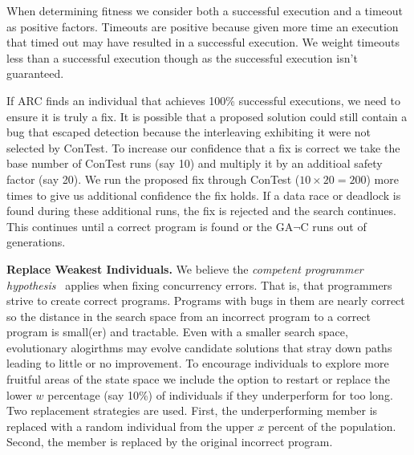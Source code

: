 \documentclass[runningheads,a4paper]{llncs}
\begin{document}
\noindent When determining fitness we consider both a successful execution and a timeout as positive factors. Timeouts are positive because given more time an execution that timed out may have resulted in a successful execution. We weight timeouts less than a successful execution though as the successful execution isn't guaranteed.

If ARC finds an individual that achieves 100\% successful executions, we need to ensure it is truly a fix. It is possible that a proposed solution could still contain a bug that escaped detection because the interleaving exhibiting it were not selected by ConTest. To increase our confidence that a fix is correct we take the base number of ConTest runs (say 10) and multiply it by an additioal safety factor (say 20). We run the proposed fix through ConTest ($10 \times 20 = 200$) more times to give us additional confidence the fix holds.  If a data race or deadlock is found during these additional runs, the fix is rejected and the search continues. This continues until a correct program is found or the GA$\neg$C runs out of generations.


\textbf{Replace Weakest Individuals.} We believe the \textit{competent programmer hypothesis}~\cite{ABD+79} applies when fixing concurrency errors.  That is, that programmers strive to create correct programs.  Programs with bugs in them are nearly correct so the distance in the search space from an incorrect program to a correct program is small(er) and tractable.  Even with a smaller search space, evolutionary alogirthms may evolve candidate solutions that stray down paths leading to little or no improvement. To encourage individuals to explore more fruitful areas of the state space we include the option to restart or replace the lower $w$ percentage (say 10\%) of individuals if they underperform for too long.  Two replacement strategies are used. First, the underperforming member is replaced with a random individual from the upper $x$ percent of the population. Second, the member is replaced by the original incorrect program.

\end{document}
